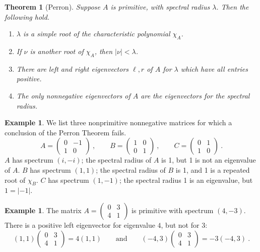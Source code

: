 \documentclass{amsart}
\newtheorem{thm}[equation]{Theorem}
\theoremstyle{definition}
\newtheorem{ex}[equation]{Example}
\theoremstyle{definition}
\numberwithin{equation}{subsection}
\begin{document}
\begin{thm}[Perron] \label{PerronTheorem}
Suppose $A$ is primitive, with spectral radius $\lambda$.
Then the following hold.
\begin{enumerate}
\item $\lambda$ is a simple root of the characteristic
polynomial $\chi_A$.
\item If $\nu$ is another root of     $\chi_A$,
then $|\nu|< \lambda$.
\item There are left and right eigenvectors $\ell , r$
of $A$ for $\lambda$ which have all entries positive.
\item The only nonnegative eigenvectors of $A$ are the eigenvectors for the
spectral radius. \\
\end{enumerate}
\end{thm}
\begin{ex}
We list three nonprimitive nonnegative matrices for which a conclusion
of the Perron Theorem fails.
\[
A=\begin{pmatrix} 0&-1 \\ 1& 0 \end{pmatrix} \ , \qquad
B=\begin{pmatrix} 1&0 \\ 0& 1 \end{pmatrix}\ , \qquad
C = \begin{pmatrix} 0&1 \\ 1& 0 \end{pmatrix} \ .
\]
$A$  has spectrum $(i, -i)$;
the spectral radius of $A$ is 1, but  1 is not an eigenvalue of $A$.
$B$  has spectrum $(1,1)$;
the spectral radius of $B$ is 1, and 1
is a repeated root of $\chi_B$.
$C$  has spectrum $(1, -1)$;
the spectral radius  1 is an eigenvalue, but $1 = |-1|$.
\end{ex}
\begin{ex}
The matrix
$A=\left(\begin{smallmatrix} 0&3 \\ 4& 1 \end{smallmatrix}\right)$ is primitive
with spectrum  $(4 ,-3)$.
There is a positive left eigenvector for eigenvalue $4$, but not for
$3$:
\[
(1,1)\begin{pmatrix} 0&3 \\ 4& 1 \end{pmatrix} =
4(1,1) \quad \quad
\text{and}
\quad \quad
(-4,3)\begin{pmatrix} 0&3 \\ 4& 1 \end{pmatrix} = -3(-4,3) \ .
\]
\end{ex}
\end{document}
